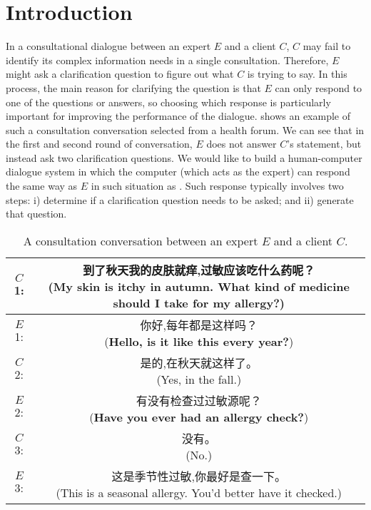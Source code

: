 \section{Introduction}
\label{intro}

In a consultational dialogue between an expert $E$ and a client $C$, $C$ may 
fail to identify its complex information needs in a single consultation. 
Therefore, $E$ might ask a clarification question to figure out what $C$ is trying to say.
In this process, the main reason for clarifying the question is that $E$ 
can only respond to one of the questions or answers, 
so choosing which response is particularly important for improving 
the performance of the dialogue.  shows an 
example of such a consultation conversation selected from a health forum. 
We can see that in the first and second round of conversation, 
$E$ does not answer $C$'s statement, but instead ask 
two clarification questions. 
We would like to build a human-computer dialogue system in which
the computer (which acts as the expert) can respond the same way as $E$
in such situation as . 
Such response typically involves two steps:
i) determine if a clarification question needs to be asked; and ii)
generate that question.

\begin{CJK}{UTF8}{gbsn}
\begin{table}[th]
\centering
\small
\begin{tabular}{cc}
\toprule
$C$1:&\makecell[l]{到了秋天我的皮肤就痒,过敏应该吃什么药呢？\\(My skin is itchy in autumn. What kind of medicine should I take for my allergy?)}\\
\hline
$E$1:&\makecell[l]{你好,每年都是这样吗？\\(\textbf{Hello, is it like this every year?})}\\
\hline
$C$2:&\makecell[l]{是的,在秋天就这样了。\\(Yes, in the fall.)}\\
\hline
$E$2:&\makecell[l]{有没有检查过过敏源呢？\\(\textbf{Have you ever had an allergy check?})}\\
\hline
$C$3:&\makecell[l]{没有。\\(No.)}\\
\hline
$E$3:&\makecell[l]{这是季节性过敏,你最好是查一下。\\(This is a seasonal allergy. You'd better have it checked.)}\\
\bottomrule
\end{tabular}
\caption{A consultation conversation between an expert $E$ and a client $C$.}
\label{tab:example1}
\end{table}
\end{CJK}

